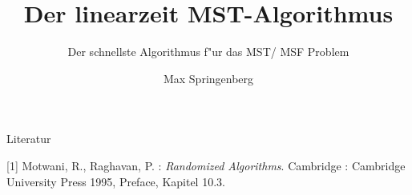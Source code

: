 \documentclass[10pt]{beamer}
\title{Der linearzeit MST-Algorithmus}
\subtitle{Der schnellste Algorithmus f"ur das MST/ MSF Problem}
\date{}
\author{Max Springenberg}
\institute{Proseminar: Randomisierte Algorithmen, TU Dortmund}
\begin{document}
\maketitle



%



%





%






\begin{frame}{Literatur}
    \begin{thebibliography}{}
    \footnotesize
        [1] Motwani, R., Raghavan, P. :
        \textit{Randomized Algorithms}. Cambridge :
        Cambridge University Press 1995, Preface, Kapitel 10.3.
    \end{thebibliography}
\end{frame}
\end{document}
